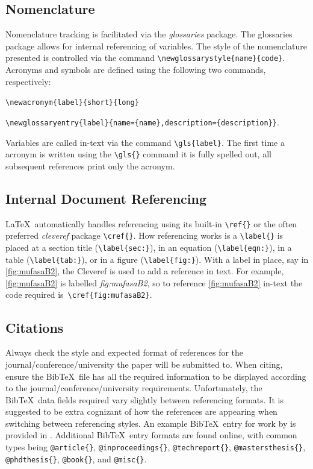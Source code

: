 \subsection{Nomenclature} \label{sec:nomenclatureLaTeXCode}

Nomenclature tracking is facilitated via the \textit{glossaries} package. 
The glossaries package allows for internal referencing of variables. 
The style of the nomenclature presented is controlled via the command \verb*|\newglossarystyle{name}{code}|. 
Acronyms and symbols are defined using the following two commands, respectively: 

\noindent
\verb*|\newacronym{label}{short}{long}| 

\noindent
\verb*|\newglossaryentry{label}{name={name},description={description}}|. 

\noindent
Variables are called in-text via the command \verb*|\gls{label}|. 
The first time a acronym is written using the \verb*|\gls{}| command it is fully spelled out, all subsequent references print only the acronym.  

\subsection{Internal Document Referencing}

\LaTeX\ automatically handles referencing using its built-in \verb*|\ref{}| or the often preferred \textit{cleveref} package \verb*|\cref{}|. 
How referencing works is a \verb*|\label{}| is placed at a section title (\verb*|\label{sec:}|), in an equation (\verb*|\label{eqn:}|), in a table (\verb*|\label{tab:}|), or in a figure (\verb*|\label{fig:}|). 
With a label in place, say in \cref{fig:mufasaB2}, the Cleveref is used to add a reference in text. For example, \cref{fig:mufasaB2} is labelled \textit{fig:mufasaB2}, so to reference \cref{fig:mufasaB2} in-text the code required is~\verb*|\cref{fig:mufasaB2}|.

\subsection{Citations} \label{sec:citations}

Always check the style and expected format of references for the journal/conference/university the paper will be submitted to. 
When citing, ensure the Bib\TeX\ file has all the required information to be displayed according to the journal/conference/university requirements. 
Unfortunately, the Bib\TeX\ data fields required vary slightly between referencing formats. It is suggested to be extra cognizant  of how the references are appearing when switching between referencing styles.  
An example Bib\TeX\ entry for work by \citeauthor{BenThesis} \cite{BenThesis} is provided in . 
Additional Bib\TeX\ entry formats are found online, with common types being \verb*|@article{}|, \verb*|@inproceedings{}|, \verb*|@techreport{}|, \verb*|@mastersthesis{}|, \verb*|@phdthesis{}|, \verb*|@book{}|, and \verb*|@misc{}|. 
 
